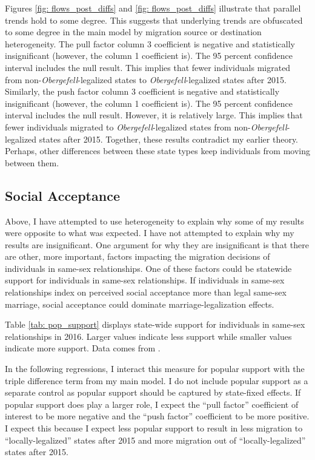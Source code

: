 \documentclass[12pt,letterpaper]{article}
\begin{document}
Figures \ref{fig: flows_post_diffs} and \ref{fig: flows_post_diffs} illustrate that parallel trends hold to some degree. This suggests that underlying trends are obfuscated to some degree in the main model by migration source or destination heterogeneity. The pull factor column 3 coefficient is negative and statistically insignificant (however, the column 1 coefficient is). The 95 percent confidence interval includes the null result. This implies that fewer individuals migrated from non-\textit{Obergefell}-legalized states to \textit{Obergefell}-legalized states after 2015.  Similarly, the push factor column 3 coefficient is negative and statistically insignificant (however, the column 1 coefficient is). The 95 percent confidence interval includes the null result. However, it is relatively large. This implies that fewer individuals migrated to \textit{Obergefell}-legalized states from non-\textit{Obergefell}-legalized states after 2015. Together, these results contradict my earlier theory. Perhaps, other differences between these state types keep individuals from moving between them.


\clearpage
\subsection{Social Acceptance}

Above, I have attempted to use heterogeneity to explain why some of my results were opposite to what was expected. I have not attempted to explain why my results are insignificant. One argument for why they are insignificant is that there are other, more important, factors impacting the migration decisions of individuals in same-sex relationships. One of these factors could be statewide support for individuals in same-sex relationships. If individuals in same-sex relationships index on perceived social acceptance more than legal same-sex marriage, social acceptance could dominate marriage-legalization effects.

Table \ref{tab: pop_support} displays state-wide support for individuals in same-sex relationships in 2016. Larger values indicate less support while smaller values indicate more support. Data comes from \citet{29}.



In the following regressions, I interact this measure for popular support with the triple difference term from my main model. I do not include popular support as a separate control as popular support should be captured by state-fixed effects. If popular support does play a larger role, I expect the “pull factor” coefficient of interest to be more negative and the “push factor” coefficient to be more positive. I expect this because I expect less popular support to result in less migration to “locally-legalized” states after 2015 and more migration out of “locally-legalized” states after 2015. 
\end{document}
